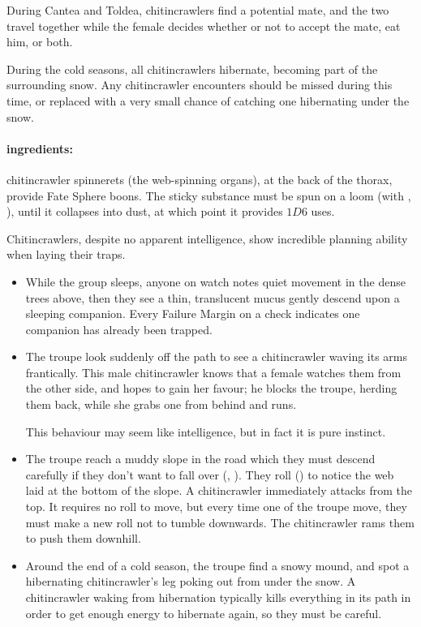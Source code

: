 \begin{multicols}{2}
During Cantea and Toldea, chitincrawlers find a potential mate, and the two travel together while the female decides whether or not to accept the mate, eat him, or both.

During the cold seasons, all chitincrawlers hibernate, becoming part of the surrounding snow.
Any chitincrawler encounters should be missed during this time, or replaced with a very small chance of catching one hibernating under the snow.

\paragraph{\Glspl{ingredient}:}
chitincrawler spinnerets (the web-spinning organs), at the back of the thorax, provide Fate Sphere \glspl{boon}.
The sticky substance must be spun on a loom (with , \tn[10]), until it collapses into dust, at which point it provides $1D6$ uses.

\showEnc
Chitincrawlers, despite no apparent intelligence, show incredible planning ability when laying their traps.

\begin{itemize}
  \item
  While the group sleeps, anyone on watch notes quiet movement in the dense trees above, then they see a thin, translucent mucus gently descend upon a sleeping companion.
  Every Failure Margin on a  check indicates one companion has already been trapped.
  \item
  The troupe look suddenly off the path to see a chitincrawler waving its arms frantically.
  This male chitincrawler knows that a female watches them from the other side, and hopes to gain her favour; he blocks the troupe, herding them back, while she grabs one from behind and runs.

  This behaviour may seem like intelligence, but in fact it is pure instinct.
  \item
  The troupe reach a muddy slope in the road which they must descend carefully if they don't want to fall over (, \tn[7]).
  They roll  (\tn[8]) to notice the web laid at the bottom of the slope.
  A chitincrawler immediately attacks from the top.
  It requires no roll to move, but every time one of the troupe move, they must make a new roll not to tumble downwards.
  The chitincrawler rams them to push them downhill.
  \item
  Around the end of a cold season, the troupe find a snowy mound, and spot a hibernating chitincrawler's leg poking out from under the snow.
  A chitincrawler waking from hibernation typically kills everything in its path in order to get enough energy to hibernate again, so they must be careful.
\end{itemize}


\end{multicols}
